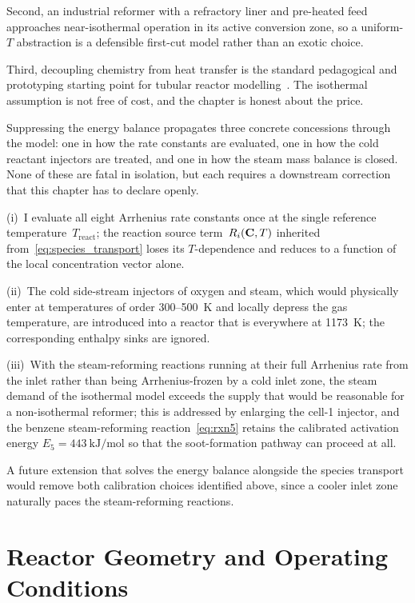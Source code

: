 Second, an industrial reformer with a refractory liner and pre-heated feed approaches near-isothermal operation in its active conversion zone, so a uniform-\(T\) abstraction is a defensible first-cut model rather than an exotic choice. 

Third, decoupling chemistry from heat transfer is the standard pedagogical and prototyping starting point for tubular reactor modelling~\cite{Levenspiel1999, Fogler2006}. The isothermal assumption is not free of cost, and the chapter is honest about the price. 

Suppressing the energy balance propagates three concrete concessions through the model: one in how the rate constants are evaluated, one in how the cold reactant injectors are treated, and one in how the steam mass balance is closed. None of these are fatal in isolation, but each requires a downstream correction that this chapter has to declare openly.

(i)~I evaluate all eight Arrhenius rate constants once at the single reference temperature~\(T_{\mathrm{react}}\); the reaction source term~\(R_i(\mathbf{C}, T)\) inherited from~\eqref{eq:species_transport} loses its \(T\)-dependence and reduces to a function of the local concentration vector alone.

(ii)~The cold side-stream injectors of oxygen and steam, which would physically enter at temperatures of order 300--500~\si{\kelvin} and locally depress the gas temperature, are introduced into a reactor that is everywhere at \SI{1173}{\kelvin}; the corresponding enthalpy sinks are ignored.

(iii)~With the steam-reforming reactions running at their full Arrhenius rate from the inlet rather than being Arrhenius-frozen by a cold inlet zone, the steam demand of the isothermal model exceeds the supply that would be reasonable for a non-isothermal reformer; this is addressed by enlarging the cell-1  injector, and the benzene steam-reforming reaction~\eqref{eq:rxn5} retains the calibrated activation energy \(E_5 = \SI{443}{\kilo\joule\per\mole}\) so that the soot-formation pathway can proceed at all.

A future extension that solves the energy balance alongside the species transport would remove both calibration choices identified above, since a cooler inlet zone naturally paces the steam-reforming reactions.

\section{Reactor Geometry and Operating Conditions}\label{sec:geometry}

